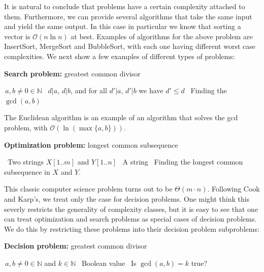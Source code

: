 \documentclass{amsart}
\theoremstyle{plain}
\newcommand{\bigo}{\mathcal{O}}
\begin{document}
It is natural to conclude that problems have a certain complexity attached to them. Furthermore, we
can provide several algorithms that take the same input and yield the same output. In this case in
particular we know that sorting a vector is $\bigo(n\ln n)$ at best. Examples of algorithms for the
above problem are InsertSort, MergeSort and BubbleSort, with each one having different worst case
complexities. We next show a few examples of different types of problems:

\begin{algorithm}[h]
  \caption*{\textbf{Search problem:} greatest common divisor}
  \begin{algorithmic}[1]
    \Require\,$a, b\neq 0\in\mathbb{N}$
    \Ensure\, $d|a$, $d|b$, and for all $d'|a$, $d'|b$ we have $d'\leq d$
    \Description\, Finding the $\gcd(a, b)$
  \end{algorithmic}
\end{algorithm}

The Euclidean algorithm is an example of an algorithm that solves the gcd problem, with
$\bigo(\ln(\max\{a,b\}))$.

\begin{algorithm}[h]
  \caption*{\textbf{Optimization problem:} longest common subsequence}
  \begin{algorithmic}[1]
    \Require\, Two strings $X[1..m]$ and $Y[1..n]$
    \Ensure\, A string
    \Description\, Finding the longest common subsequence in $X$ and $Y$.
  \end{algorithmic}
\end{algorithm}

This classic computer science problem turns out to be $\Theta(m\cdot n)$. Following Cook and
Karp's, we treat only the case for decision problems. One might think this severly restricts the
generality of complexity classes, but it is easy to see that one can treat optimization and search
problems as special cases of decision problems. We do this by restricting these problems into their
decision problem subproblems:

\begin{algorithm}[h]
  \caption*{\textbf{Decision problem:} greatest common divisor}
  \begin{algorithmic}[1]
    \Require\,$a, b\neq 0\in\mathbb{N}$ and $k\in\mathbb{N}$
    \Ensure\, Boolean value
    \Description\, Is $\gcd(a, b)=k$ true?
  \end{algorithmic}
\end{algorithm}
\end{document}
